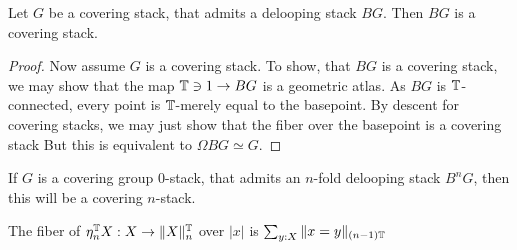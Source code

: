 \documentclass{article}
\begin{document}
\begin{lemma}{\label{lemma:deloopingCS}}
	Let $G$ be a covering stack, that admits a delooping stack $B G$. Then $B G$ is a covering stack.
\end{lemma}
\begin{proof}
	Now assume $G$ is a covering stack. 	To show, that  $B G$ is a covering stack, we may show that the map $\mathbb{T} \ni 1 \to B G$ is a geometric atlas. As $B G$ is $\mathbb{T}$-connected, every point is $\mathbb{T}$-merely equal to the basepoint. By descent for covering stacks, we may just show that the fiber over the basepoint is a covering stack
	But this is equivalent to $\Omega B G \simeq G$. 
\end{proof}
\begin{corollary}
	If $G$ is a covering group 0-stack,  that admits an $n$-fold delooping stack $B^n G$, then this will be a covering $n$-stack.
\end{corollary}
\begin{lemma}
	The fiber of $\eta_n^{\mathbb{T}} X : X \to \|X\|_n^{\mathbb{T}}$ over $|x|$ is $\sum_{y : X} \| x = y\|_{(n-1)\mathbb{T}}$
\end{lemma}
\end{document}
